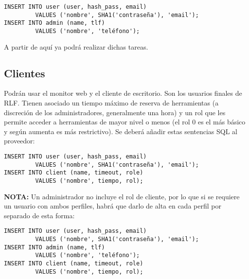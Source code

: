 \begin{verbatim}
INSERT INTO user (user, hash_pass, email) 
         VALUES ('nombre', SHA1('contraseña'), 'email');
INSERT INTO admin (name, tlf)
         VALUES ('nombre', 'teléfono');
\end{verbatim}

A partir de aquí ya podrá realizar dichas tareas.

\subsection*{Clientes}
Podrán usar el monitor web y el cliente de escritorio. Son los 
usuarios finales de RLF. Tienen asociado un tiempo máximo de 
reserva de herramientas (a discreción de los administradores, 
generalmente una hora) y un rol que les permite acceder a herramientas 
de mayor nivel o menos (el rol  0 es el más básico y según aumenta es 
más restrictivo). Se deberá añadir estas sentencias SQL al proveedor:

\begin{verbatim}
INSERT INTO user (user, hash_pass, email)
         VALUES ('nombre', SHA1('contraseña'), 'email');
INSERT INTO client (name, timeout, role)
         VALUES ('nombre', tiempo, rol);
\end{verbatim}

\textbf{NOTA:} Un administrador no incluye el rol de cliente, por lo 
que si se requiere un usuario con ambos perfiles, habrá que darlo de 
alta en cada perfil por separado de esta forma:

\begin{verbatim}
INSERT INTO user (user, hash_pass, email)
         VALUES ('nombre', SHA1('contraseña'), 'email');
INSERT INTO admin (name, tlf)
         VALUES ('nombre', 'teléfono');
INSERT INTO client (name, timeout, role)
         VALUES ('nombre', tiempo, rol);
\end{verbatim}
